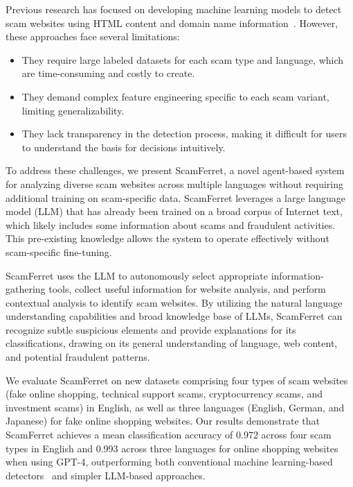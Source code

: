\documentclass[runningheads]{llncs}
\begin{document}
Previous research has focused on developing machine learning models to detect scam websites using HTML content and domain name information~\cite{DBLP:conf/ndss/LiYN23,DBLP:conf/www/SrinivasanKMANA18}.
However, these approaches face several limitations:
\begin{itemize}
    \item They require large labeled datasets for each scam type and language, which are time-consuming and costly to create.
    \item They demand complex feature engineering specific to each scam variant, limiting generalizability.
    \item They lack transparency in the detection process, making it difficult for users to understand the basis for decisions intuitively.
\end{itemize}

To address these challenges, we present ScamFerret, a novel agent-based system for analyzing diverse scam websites across multiple languages without requiring additional training on scam-specific data.
ScamFerret leverages a large language model (LLM) that has already been trained on a broad corpus of Internet text, which likely includes some information about scams and fraudulent activities.
This pre-existing knowledge allows the system to operate effectively without scam-specific fine-tuning.

ScamFerret uses the LLM to autonomously select appropriate information-gathering tools, collect useful information for website analysis, and perform contextual analysis to identify scam websites.
By utilizing the natural language understanding capabilities and broad knowledge base of LLMs, ScamFerret can recognize subtle suspicious elements and provide explanations for its classifications, drawing on its general understanding of language, web content, and potential fraudulent patterns.

We evaluate ScamFerret on new datasets comprising four types of scam websites (fake online shopping, technical support scams, cryptocurrency scams, and investment scams) in English, as well as three languages (English, German, and Japanese) for fake online shopping websites.
Our results demonstrate that ScamFerret achieves a mean classification accuracy of 0.972 across four scam types in English and 0.993 across three languages for online shopping websites when using GPT-4, outperforming both conventional machine learning-based detectors~\cite{DBLP:conf/sp/BitaabCOLWAWBSD23,DBLP:conf/acsac/KotziasRPSB23} and simpler LLM-based approaches.
\end{document}

